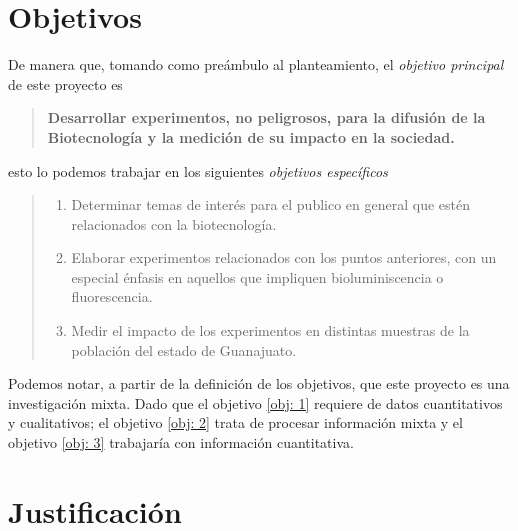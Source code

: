 \documentclass[12pt]{article}
\begin{document}
\newpage
\section{Objetivos}

	\par De manera que, tomando como preámbulo al planteamiento, el \textit{ objetivo principal } de este proyecto es	
	\begin{quote}

		\textbf{Desarrollar experimentos, no peligrosos, para la difusión de la Biotecnología y la medición de su impacto en la sociedad.}

	\end{quote}
	
	\noindent esto lo podemos trabajar en los siguientes \textit{ objetivos específicos }
	
	\begin{quote} \begin{enumerate} \it
		\item Determinar temas de interés para el publico en general que estén relacionados con la biotecnología. \label{obj: 1}
		\item Elaborar experimentos relacionados con los puntos anteriores, con un especial énfasis en aquellos que impliquen bioluminiscencia o fluorescencia. \label{obj: 2}
		\item Medir el impacto de los experimentos en distintas muestras de la población del estado de Guanajuato. \label{obj: 3}
	\end{enumerate} \end{quote}
	
	\noindent Podemos notar, a partir de la definición de los objetivos, que este proyecto es una investigación mixta. Dado que el objetivo \ref{obj: 1} requiere de datos cuantitativos y cualitativos; el objetivo \ref{obj: 2} trata de procesar información mixta y el objetivo \ref{obj: 3} trabajaría con información cuantitativa.






	
\section{Justificación}
\end{document}
